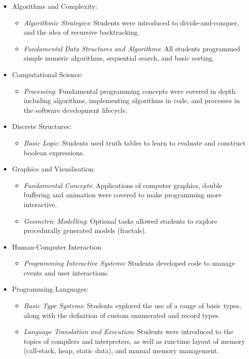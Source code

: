 \begin{itemize}[noitemsep,nolistsep]
	\item Algorithms and Complexity:
	\begin{itemize}[noitemsep,nolistsep]
		\item \emph{Algorithmic Strategies}: Students were introduced to divide-and-conquer, and the idea of recursive backtracking.
		\item \emph{Fundamental Data Structures and Algorithms}: All students programmed simple numeric algorithms, sequential search, and basic sorting.
	\end{itemize}

	\item Computational Science:
	\begin{itemize}[noitemsep,nolistsep]
		\item \emph{Processing}: Fundamental programming concepts were covered in depth including algorithms,  implementing algorithms in code, and processes in the software development lifecycle.
	\end{itemize}

	\item Discrete Structures:
	\begin{itemize}[noitemsep,nolistsep]
		\item \emph{Basic Logic}: Students used truth tables to learn to evaluate and construct boolean expressions.
	\end{itemize}
	
	\item Graphics and Visualisation:
	\begin{itemize}[noitemsep,nolistsep]
		\item \emph{Fundamental Concepts}: Applications of computer graphics, double buffering and animation were covered to make programming more interactive.
		\item \emph{Geometric Modelling}: Optional tasks allowed students to explore procedurally generated models (fractals).
	\end{itemize}

	\item Human-Computer Interaction
	\begin{itemize}[noitemsep,nolistsep]
		\item \emph{Programming Interactive Systems}: Students developed code to manage events and user interactions.
	\end{itemize}

	\item Programming Languages:
	\begin{itemize}[noitemsep,nolistsep]
		\item \emph{Basic Type Systems}: Students explored the use of a range of basic types, along with the definition of custom enumerated and record types.
		\item \emph{Language Translation and Execution}: Students were introduced to the topics of compilers and interpreters, as well as run-time layout of memory (call-stack, heap, static data), and manual memory management.
	\end{itemize}


\end{itemize}
